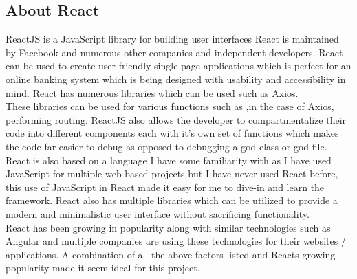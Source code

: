 \subsection{About React}
ReactJS is a JavaScript library for building user interfaces\cite{React} React is maintained by Facebook and numerous other companies and independent developers.  React can be used to create user friendly single-page applications which is perfect for an online banking system which is being designed with usability and accessibility in mind.  React has numerous libraries which can be used such as Axios\cite{Axios}.
\\
 These libraries can be used for various functions such as ,in the case of Axios, performing routing.  ReactJS also allows the developer to compartmentalize their code into different components each with it's own set of functions which makes the code far easier to debug as opposed to debugging a god class or god file.
\\
   React is also based on a language I have some familiarity with as I have used JavaScript for multiple web-based projects but I have never
   used React before, this use of JavaScript in React made it easy for me to dive-in and learn the framework.  React also has multiple
   libraries which can be utilized to provide a modern and minimalistic user interface without sacrificing functionality.
\\
React has been growing in popularity along with similar technologies such as Angular and multiple companies are using these technologies for their websites / applications.  A combination of all the above factors listed and Reacts growing popularity made it seem ideal for this project.
